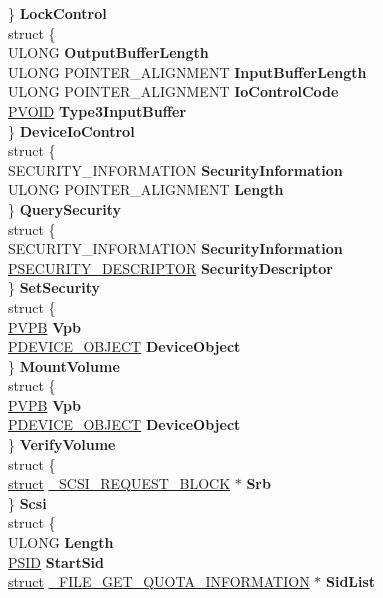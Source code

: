 \begin{DoxyCompactItemize}
\begin{tabbing}
\>\} {\bfseries LockControl}\\
\>struct \{\\
\>\>ULONG {\bfseries OutputBufferLength}\\
\>\>ULONG POINTER\_ALIGNMENT {\bfseries InputBufferLength}\\
\>\>ULONG POINTER\_ALIGNMENT {\bfseries IoControlCode}\\
\>\>\hyperlink{interfacevoid}{PVOID} {\bfseries Type3InputBuffer}\\
\>\} {\bfseries DeviceIoControl}\\
\>struct \{\\
\>\>SECURITY\_INFORMATION {\bfseries SecurityInformation}\\
\>\>ULONG POINTER\_ALIGNMENT {\bfseries Length}\\
\>\} {\bfseries QuerySecurity}\\
\>struct \{\\
\>\>SECURITY\_INFORMATION {\bfseries SecurityInformation}\\
\>\>\hyperlink{struct___s_e_c_u_r_i_t_y___d_e_s_c_r_i_p_t_o_r}{PSECURITY\_DESCRIPTOR} {\bfseries SecurityDescriptor}\\
\>\} {\bfseries SetSecurity}\\
\>struct \{\\
\>\>\hyperlink{struct___v_p_b}{PVPB} {\bfseries Vpb}\\
\>\>\hyperlink{struct___d_e_v_i_c_e___o_b_j_e_c_t}{PDEVICE\_OBJECT} {\bfseries DeviceObject}\\
\>\} {\bfseries MountVolume}\\
\>struct \{\\
\>\>\hyperlink{struct___v_p_b}{PVPB} {\bfseries Vpb}\\
\>\>\hyperlink{struct___d_e_v_i_c_e___o_b_j_e_c_t}{PDEVICE\_OBJECT} {\bfseries DeviceObject}\\
\>\} {\bfseries VerifyVolume}\\
\>struct \{\\
\>\>\hyperlink{interfacestruct}{struct} \hyperlink{struct___s_c_s_i___r_e_q_u_e_s_t___b_l_o_c_k}{\_SCSI\_REQUEST\_BLOCK} $\ast$ {\bfseries Srb}\\
\>\} {\bfseries Scsi}\\
\>struct \{\\
\>\>ULONG {\bfseries Length}\\
\>\>\hyperlink{struct___s_i_d}{PSID} {\bfseries StartSid}\\
\>\>\hyperlink{interfacestruct}{struct} \hyperlink{struct___f_i_l_e___g_e_t___q_u_o_t_a___i_n_f_o_r_m_a_t_i_o_n}{\_FILE\_GET\_QUOTA\_INFORMATION} $\ast$ {\bfseries SidList}\\

\end{tabbing}
\end{DoxyCompactItemize}
